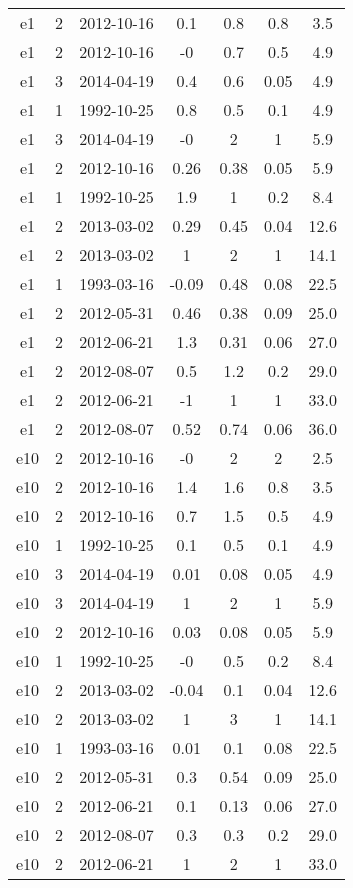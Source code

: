\begin{table*}[htp]
\begin{tabular}{ccccccc}
e1 & 2 & 2012-10-16 & 0.1 & 0.8 & 0.8 & 3.5 \\
e1 & 2 & 2012-10-16 & -0 & 0.7 & 0.5 & 4.9 \\
e1 & 3 & 2014-04-19 & 0.4 & 0.6 & 0.05 & 4.9 \\
e1 & 1 & 1992-10-25 & 0.8 & 0.5 & 0.1 & 4.9 \\
e1 & 3 & 2014-04-19 & -0 & 2 & 1 & 5.9 \\
e1 & 2 & 2012-10-16 & 0.26 & 0.38 & 0.05 & 5.9 \\
e1 & 1 & 1992-10-25 & 1.9 & 1 & 0.2 & 8.4 \\
e1 & 2 & 2013-03-02 & 0.29 & 0.45 & 0.04 & 12.6 \\
e1 & 2 & 2013-03-02 & 1 & 2 & 1 & 14.1 \\
e1 & 1 & 1993-03-16 & -0.09 & 0.48 & 0.08 & 22.5 \\
e1 & 2 & 2012-05-31 & 0.46 & 0.38 & 0.09 & 25.0 \\
e1 & 2 & 2012-06-21 & 1.3 & 0.31 & 0.06 & 27.0 \\
e1 & 2 & 2012-08-07 & 0.5 & 1.2 & 0.2 & 29.0 \\
e1 & 2 & 2012-06-21 & -1 & 1 & 1 & 33.0 \\
e1 & 2 & 2012-08-07 & 0.52 & 0.74 & 0.06 & 36.0 \\
e10 & 2 & 2012-10-16 & -0 & 2 & 2 & 2.5 \\
e10 & 2 & 2012-10-16 & 1.4 & 1.6 & 0.8 & 3.5 \\
e10 & 2 & 2012-10-16 & 0.7 & 1.5 & 0.5 & 4.9 \\
e10 & 1 & 1992-10-25 & 0.1 & 0.5 & 0.1 & 4.9 \\
e10 & 3 & 2014-04-19 & 0.01 & 0.08 & 0.05 & 4.9 \\
e10 & 3 & 2014-04-19 & 1 & 2 & 1 & 5.9 \\
e10 & 2 & 2012-10-16 & 0.03 & 0.08 & 0.05 & 5.9 \\
e10 & 1 & 1992-10-25 & -0 & 0.5 & 0.2 & 8.4 \\
e10 & 2 & 2013-03-02 & -0.04 & 0.1 & 0.04 & 12.6 \\
e10 & 2 & 2013-03-02 & 1 & 3 & 1 & 14.1 \\
e10 & 1 & 1993-03-16 & 0.01 & 0.1 & 0.08 & 22.5 \\
e10 & 2 & 2012-05-31 & 0.3 & 0.54 & 0.09 & 25.0 \\
e10 & 2 & 2012-06-21 & 0.1 & 0.13 & 0.06 & 27.0 \\
e10 & 2 & 2012-08-07 & 0.3 & 0.3 & 0.2 & 29.0 \\
e10 & 2 & 2012-06-21 & 1 & 2 & 1 & 33.0 \\

\end{tabular}
\end{table*}
